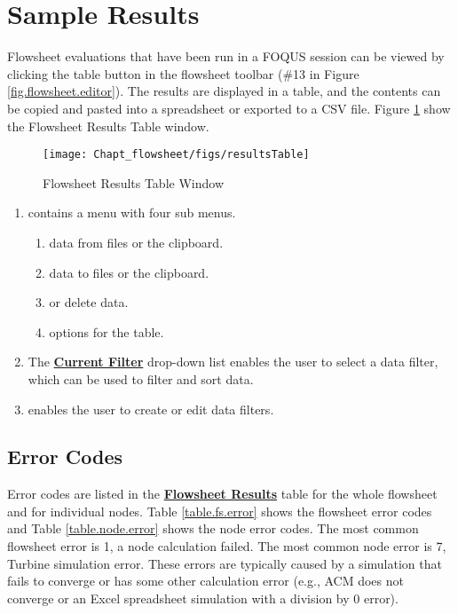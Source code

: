 \section{Sample Results}\label{sec.flowsheet.results.table}

Flowsheet evaluations that have been run in a FOQUS session can be viewed by clicking the table button in the flowsheet toolbar (\#13 in Figure \ref{fig.flowsheet.editor}). The results are displayed in a table, and the contents can be copied and pasted into a spreadsheet or exported to a CSV file. Figure \ref{fig.results.table} show the Flowsheet Results Table window.


\begin{figure}[H]
	\begin{center}
		\texttt{[image: Chapt\_flowsheet/figs/resultsTable]}
		\caption{Flowsheet Results Table Window}
		\label{fig.results.table}
	\end{center}
\end{figure}
\begin{samepage}
\begin{enumerate}
	\item {} contains a menu with four sub menus.
	\begin{enumerate}
		\item {} data from files or the clipboard.
		\item {} data to files or the clipboard.
		\item {} or delete data.
		\item {} options for the table.
	\end{enumerate}
	\item The \textbf{\underline{Current Filter}} drop-down list enables the user to select a data filter, which can be used to filter and sort data.
	\item {} enables the user to create or edit data filters.
\end{enumerate}
\end{samepage}

\subsection{Error Codes}
Error codes are listed in the \textbf{\underline{Flowsheet Results}} table for the whole flowsheet and for individual nodes. Table \ref{table.fs.error} shows the flowsheet error codes and Table \ref{table.node.error} shows the node error codes. The most common flowsheet error is 1, a node calculation failed. The most common node error is 7, Turbine simulation error. These errors are typically caused by a simulation that fails to converge or has some other calculation error (e.g., ACM does not converge or an Excel spreadsheet simulation with a division by 0 error). 

